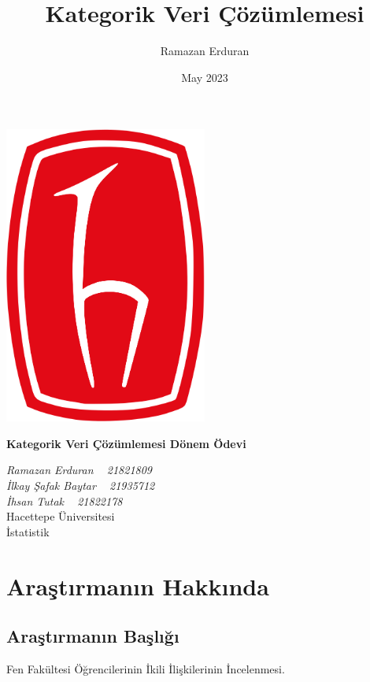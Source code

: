 \documentclass{article}
\title{Kategorik Veri Çözümlemesi}
\author{Ramazan Erduran}
\date{May 2023}
\begin{document}
\begin{titlepage}
    \begin{center}
        \includegraphics[width=0.5\textwidth]{Imgs/hacettepe_logo.png}
        
        \vspace*{1cm}
        \Huge
        \textbf{Kategorik Veri Çözümlemesi Dönem Ödevi}

        \vfill
        
        \Large
        \textit{Ramazan Erduran ~ 21821809 \\
        İlkay Şafak Baytar ~ 21935712 \\
        İhsan Tutak ~ 21822178
        }\\
        
        \vfill
        Hacettepe Üniversitesi \\
        İstatistik \\
        
    \end{center}
\end{titlepage}

\newpage

\tableofcontents
\clearpage

\section{Araştırmanın Hakkında}
\subsection{Araştırmanın Başlığı}
Fen Fakültesi Öğrencilerinin İkili İlişkilerinin İncelenmesi.
\end{document}
